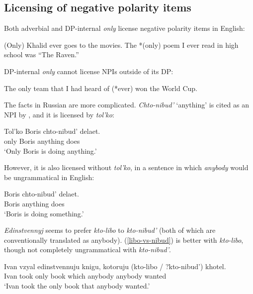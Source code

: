 \documentclass{article}
\begin{document}
\subsection{Licensing of negative polarity items}
Both adverbial and DP-internal \textit{only} license negative polarity items in English:

\begin{exe}
	\ex *(Only) Khalid ever goes to the movies.
	\ex The *(only) poem I ever read in high school was ``The Raven.''
\end{exe}

DP-internal \textit{only} cannot license NPIs outside of its DP:

\begin{exe}
	\ex The only team that I had heard of (*ever) won the World Cup.
\end{exe}

The facts in Russian are more complicated. \textit{Chto-nibud'} `anything' is cited as an NPI by \citet{russneg}, and it is licensed by \textit{tol'ko}:

\begin{exe}
	\ex \gll Tol'ko Boris chto-nibud' delaet.\\
	only Boris anything does\\
	\glt `Only Boris is doing anything.'
\end{exe}

However, it is also licensed without \textit{tol'ko}, in a sentence in which \textit{anybody} would be ungrammatical in English:

\begin{exe}
	\ex \label{nibud-no-polarity} \gll Boris chto-nibud' delaet.\\
	Boris anything does\\
	\glt `Boris is doing something.' %
\end{exe}

\textit{Edinstvennyj} seems to prefer \textit{kto-libo} to \textit{kto-nibud'} (both of which are conventionally translated as anybody). (\ref{libo-vs-nibud}) is better with \textit{kto-libo}, though not completely ungrammatical with \textit{kto-nibud'}.

\begin{exe}
	\ex \label{libo-vs-nibud} \gll Ivan vzyal edinstvennuju knigu, kotoruju (kto-libo / ?kto-nibud') khotel.\\
	Ivan took only book which anybody {} anybody wanted\\
	\glt `Ivan took the only book that anybody wanted.'
\end{exe}
\end{document}
